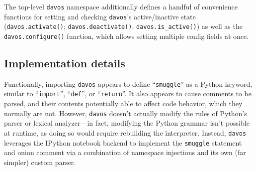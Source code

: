 \documentclass[preprint,12pt,a4paper]{elsarticle}
\begin{document}
\noindent The top-level \texttt{davos} namespace additionally defines a handful of convenience functions for setting and checking \texttt{davos}'s active/inactive state (\texttt{davos.activate()}; \texttt{davos.deactivate()}; \texttt{davos.is\_active()}) as well as the \texttt{davos.configure()} function, which allows setting multiple config fields at once.


\subsection{Implementation details}\label{subsec:implementation}
Functionally, importing \texttt{davos} appears to define ``\texttt{smuggle}'' as a Python keyword, similar to ``\texttt{import}'', ``\texttt{def}'', or ``\texttt{return}''. It also appears to cause comments to be parsed, and their contents potentially able to affect code behavior, which they normally are not. However, \texttt{davos} doesn't actually modify the rules of Python's parser or lexical analyzer---in fact, modifying the Python grammar isn't possible at runtime, as doing so would require rebuilding the interpreter. Instead, \texttt{davos} leverages the IPython notebook backend to implement the \texttt{smuggle} statement and onion comment via a combination of namespace injections and its own (far simpler) custom parser.
\end{document}
